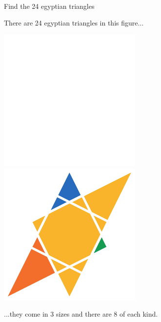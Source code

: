 \documentclass[14pt]{beamer}
\begin{document}

    \begin{frame}{Find the 24 egyptian triangles}
        \begin{center}
            There are 24 egyptian triangles in this figure...

            \bigskip \bigskip

            \includegraphics[height=18ex]{figures/figure002b.pdf}\qquad
            \includegraphics[height=18ex]{figures/figure002c.pdf}\\

            \bigskip \bigskip

            ...they come in 3 sizes and there are 8 of each kind.
        \end{center}
    \end{frame}

\end{document}
